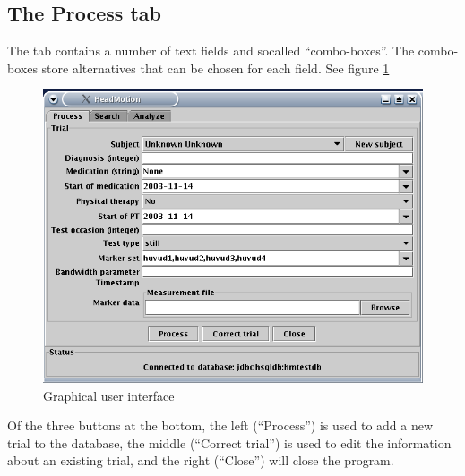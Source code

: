\documentclass[a4paper,11pt]{article}
\begin{document}
\subsection{The Process tab}
The tab contains a number of text fields and
socalled ``combo-boxes''. The combo-boxes store alternatives that can
be chosen for each field. See figure \ref{fig:processgui}
\begin{figure}[htbp]
  \centering
  \includegraphics[width=120mm]{figures/gui_overview.png}
  \caption{Graphical user interface}
  \label{fig:processgui}
\end{figure}

Of the three buttons at the bottom, the left (``Process'') is used to
add a new trial to the database, the middle (``Correct trial'') is
used to edit the information about an existing trial, and the right
(``Close'') will close the program. 
\end{document}
